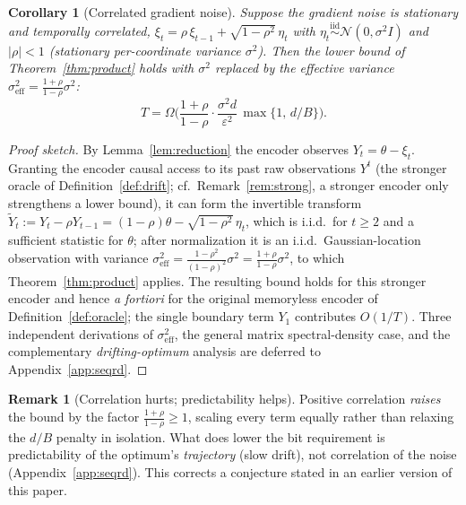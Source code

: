 \documentclass[11pt]{article}
\newtheorem{corollary}{Corollary}
\theoremstyle{definition}
\newtheorem{remark}{Remark}
\newcommand{\eps}{\varepsilon}
\newcommand{\Ncal}{\mathcal{N}}
\begin{document}
\begin{corollary}[Correlated gradient noise]
\label{cor:correlated}
Suppose the gradient noise is stationary and temporally correlated,
$\xi_t=\rho\,\xi_{t-1}+\sqrt{1-\rho^2}\,\eta_t$ with $\eta_t\stackrel{\mathrm{iid}}{\sim}\Ncal(0,\sigma^2 I)$
and $|\rho|<1$ (stationary per-coordinate variance $\sigma^2$). Then the lower bound of
Theorem~\ref{thm:product} holds with $\sigma^2$ replaced by the effective variance
$\sigma^2_{\mathrm{eff}}=\tfrac{1+\rho}{1-\rho}\sigma^2$:
\[
T=\Omega\!\Big(\frac{1+\rho}{1-\rho}\cdot\frac{\sigma^2 d}{\eps^2}\,\max\{1,\,d/B\}\Big).
\]
\end{corollary}
\begin{proof}[Proof sketch]
By Lemma~\ref{lem:reduction} the encoder observes $Y_t=\theta-\xi_t$. Granting the encoder causal access
to its past raw observations $Y^t$ (the stronger oracle of Definition~\ref{def:drift};
cf.\ Remark~\ref{rem:strong}, a stronger encoder only strengthens a lower bound), it can form the
invertible transform $\tilde Y_t:=Y_t-\rho Y_{t-1}=(1-\rho)\theta-\sqrt{1-\rho^2}\,\eta_t$, which is
i.i.d.\ for $t\ge2$ and a sufficient statistic for $\theta$; after normalization it is an i.i.d.\
Gaussian-location observation with variance
$\sigma^2_{\mathrm{eff}}=\tfrac{1-\rho^2}{(1-\rho)^2}\sigma^2=\tfrac{1+\rho}{1-\rho}\sigma^2$, to which
Theorem~\ref{thm:product} applies. The resulting bound holds for this stronger encoder and hence
\emph{a fortiori} for the original memoryless encoder of Definition~\ref{def:oracle}; the single
boundary term $Y_1$ contributes $O(1/T)$. Three independent derivations of $\sigma^2_{\mathrm{eff}}$, the
general matrix spectral-density case, and the complementary \emph{drifting-optimum} analysis are
deferred to Appendix~\ref{app:seqrd}.
\end{proof}

\begin{remark}[Correlation hurts; predictability helps]
Positive correlation \emph{raises} the bound by the factor $\tfrac{1+\rho}{1-\rho}\ge1$, scaling every
term equally rather than relaxing the $d/B$ penalty in isolation. What does lower the bit requirement is
predictability of the optimum's \emph{trajectory} (slow drift), not correlation of the noise
(Appendix~\ref{app:seqrd}). This corrects a conjecture stated in an earlier version of this paper.
\end{remark}
\end{document}
